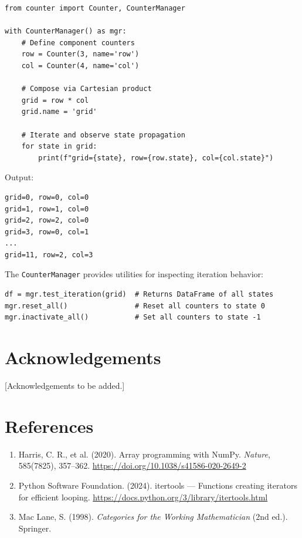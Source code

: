 \documentclass[10pt,a4paper,onecolumn]{article}
\begin{document}
\begin{lstlisting}
from counter import Counter, CounterManager

with CounterManager() as mgr:
    # Define component counters
    row = Counter(3, name='row')
    col = Counter(4, name='col')

    # Compose via Cartesian product
    grid = row * col
    grid.name = 'grid'

    # Iterate and observe state propagation
    for state in grid:
        print(f"grid={state}, row={row.state}, col={col.state}")
\end{lstlisting}

Output:
\begin{lstlisting}[language={}]
grid=0, row=0, col=0
grid=1, row=1, col=0
grid=2, row=2, col=0
grid=3, row=0, col=1
...
grid=11, row=2, col=3
\end{lstlisting}

The \texttt{CounterManager} provides utilities for inspecting iteration behavior:

\begin{lstlisting}
df = mgr.test_iteration(grid)  # Returns DataFrame of all states
mgr.reset_all()                # Reset all counters to state 0
mgr.inactivate_all()           # Set all counters to state -1
\end{lstlisting}

\section{Acknowledgements}

[Acknowledgements to be added.]

\section{References}

\begin{enumerate}
\item Harris, C. R., et al. (2020). Array programming with NumPy. \textit{Nature}, 585(7825), 357--362. \url{https://doi.org/10.1038/s41586-020-2649-2}

\item Python Software Foundation. (2024). itertools --- Functions creating iterators for efficient looping. \url{https://docs.python.org/3/library/itertools.html}

\item Mac Lane, S. (1998). \textit{Categories for the Working Mathematician} (2nd ed.). Springer.
\end{enumerate}
\end{document}
